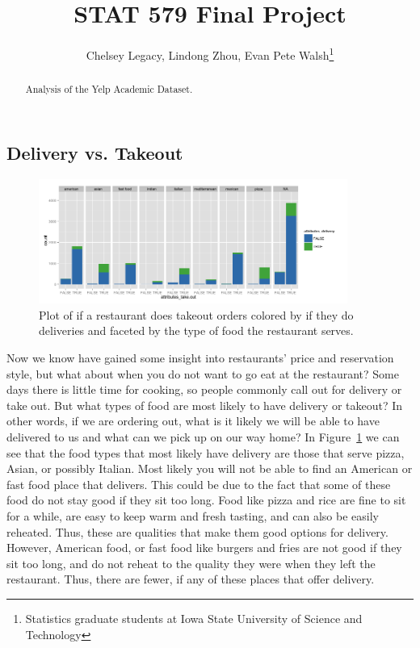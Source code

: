 \documentclass[11pt]{article}
\begin{document}
\author{Chelsey Legacy, Lindong Zhou, Evan Pete Walsh\footnote{Statistics graduate students at Iowa State University of Science and Technology}}
\title{STAT 579 Final Project}
\maketitle

\begin{abstract}
Analysis of the Yelp Academic Dataset.
\end{abstract}

\newpage

\tableofcontents

\newpage

\pagestyle{fancy}
\rhead{\thepage}
\rfoot{\today}
\cfoot{}%


\subsection{Delivery vs. Takeout}

\begin{figure}[h!]
  \caption{Plot of if a restaurant does takeout orders colored by if they do deliveries and faceted by the type of food the restaurant serves.}
  \centering
  \label{takeout}
    \includegraphics[width=0.9\textwidth]{Figures/takeoutdelivery.png}
\end{figure}
Now we know have gained some insight into restaurants' price and reservation style, but what about when you do not want to go eat at the restaurant? Some days there is little time for cooking, so people commonly call out for delivery or take out.  But what types of food are most likely to have delivery or takeout?  In other words, if we are ordering out, what is it likely we will be able to have delivered to us and what can we pick up on our way home? In 
Figure~\ref{takeout} we can see that the food types that most likely have delivery are those that serve pizza, Asian, or possibly Italian.  Most likely you will not be able to find an American or fast food place that delivers.  This could be due to the fact that some of these food do not stay good if they sit too long.  Food like pizza and rice are fine to sit for a while,  are easy to keep warm and fresh tasting, and can also be easily reheated. Thus, these are qualities that make them good options for delivery.  However, American food, or fast food like burgers and fries are not good if they sit too long, and do not reheat to the quality they were when they left the restaurant.  Thus, there are fewer, if any of these places that offer delivery.
\end{document}
